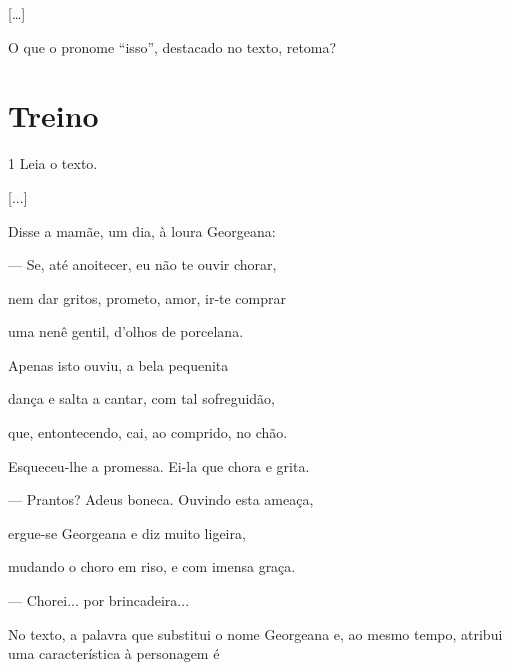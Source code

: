 \begin{myquote}
{[}\ldots{]}
\end{myquote}


O que o pronome ``isso'', destacado no texto, retoma?


\pagebreak

\section*{Treino}

\num{1} Leia o texto.

\begin{myquote}
{[}...{]}

Disse a mamãe, um dia, à loura Georgeana:

--- Se, até anoitecer, eu não te ouvir chorar,

nem dar gritos, prometo, amor, ir-te comprar

uma nenê gentil, d'olhos de porcelana.

Apenas isto ouviu, a bela pequenita

dança e salta a cantar, com tal sofreguidão,

que, entontecendo, cai, ao comprido, no chão.

Esqueceu-lhe a promessa. Ei-la que chora e grita.

--- Prantos? Adeus boneca. Ouvindo esta ameaça,

ergue-se Georgeana e diz muito ligeira,

mudando o choro em riso, e com imensa graça.

--- Chorei... por brincadeira...
\end{myquote}


No texto, a palavra que substitui o nome Georgeana e, ao mesmo tempo,
atribui uma característica à personagem é

